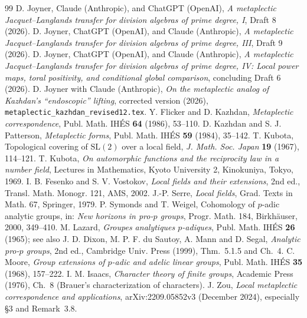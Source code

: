 \documentclass[11pt]{article}
\theoremstyle{plain}
\theoremstyle{definition}
\begin{document}
\begin{thebibliography}{99}
 D. Joyner, Claude (Anthropic), and ChatGPT (OpenAI),
\emph{A metaplectic Jacquet--Langlands transfer for division
algebras of prime degree, I}, Draft 8 (2026).
 D. Joyner, ChatGPT (OpenAI), and Claude (Anthropic),
\emph{A metaplectic Jacquet--Langlands transfer for division
algebras of prime degree, III}, Draft 9 (2026).
 D. Joyner, ChatGPT (OpenAI), and Claude (Anthropic),
\emph{A metaplectic Jacquet--Langlands transfer for division
algebras of prime degree, IV: Local power maps, toral positivity,
and conditional global comparison}, concluding Draft 6 (2026).
 D. Joyner with Claude (Anthropic),
\emph{On the metaplectic analog of Kazhdan's ``endoscopic'' lifting},
corrected version (2026), \texttt{metaplectic\_kazhdan\_revised12.tex}.
 Y. Flicker and D. Kazhdan,
\emph{Metaplectic correspondence}, Publ. Math. IH\'ES
\textbf{64} (1986), 53--110.
 D. Kazhdan and S. J. Patterson, \emph{Metaplectic forms},
Publ. Math. IH\'ES \textbf{59} (1984), 35--142.
 T. Kubota, Topological covering of $\mathrm{SL}(2)$ over a
local field, \emph{J. Math. Soc. Japan} \textbf{19} (1967), 114--121.
 T. Kubota, \emph{On automorphic functions and the
reciprocity law in a number field}, Lectures in Mathematics, Kyoto
University 2, Kinokuniya, Tokyo, 1969.
 I. B. Fesenko and S. V. Vostokov, \emph{Local fields and
their extensions}, 2nd ed., Transl. Math. Monogr. 121, AMS, 2002.
 J.-P. Serre, \emph{Local fields}, Grad. Texts in Math.
67, Springer, 1979.
 P. Symonds and T. Weigel, Cohomology of $p$-adic analytic
groups, in: \emph{New horizons in pro-$p$ groups}, Progr. Math. 184,
Birkh\"auser, 2000, 349--410.
 M. Lazard, \emph{Groupes analytiques $p$-adiques},
Publ. Math. IH\'ES \textbf{26} (1965); see also J. D. Dixon, M. P. F. du
Sautoy, A. Mann and D. Segal, \emph{Analytic pro-$p$ groups}, 2nd ed.,
Cambridge Univ. Press (1999), Thm.~5.1.5 and Ch.~4.
 C. Moore, \emph{Group extensions of $p$-adic and adelic
linear groups}, Publ. Math. IH\'ES \textbf{35} (1968), 157--222.
 I. M. Isaacs, \emph{Character theory of finite groups},
Academic Press (1976), Ch.~8 (Brauer's characterization of characters).
 J. Zou,
\emph{Local metaplectic correspondence and applications},
arXiv:2209.05852v3 (December 2024), especially \S3 and Remark~3.8.
\end{thebibliography}
\end{document}
